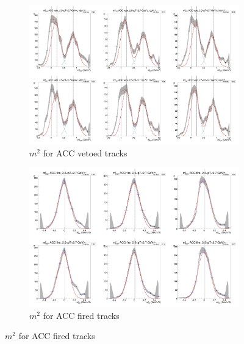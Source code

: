 \begin{figure}[H]
  \ContinuedFloat
    \begin{subfigure}{1\textwidth}
    \includegraphics[width=1\textwidth]{hiptfits/neg/PSm2_cent0_ich0_accfire0_ptbin10.jpg}
    \caption{$m^2$ for ACC vetoed tracks}
    \end{subfigure}
    \begin{subfigure}{1\textwidth}
    \includegraphics[width=1\textwidth]{hiptfits/neg/PSm2_cent0_ich0_accfire1_ptbin10.jpg}
    \caption{$m^2$ for ACC fired tracks}
    \end{subfigure}  
\end{figure}
